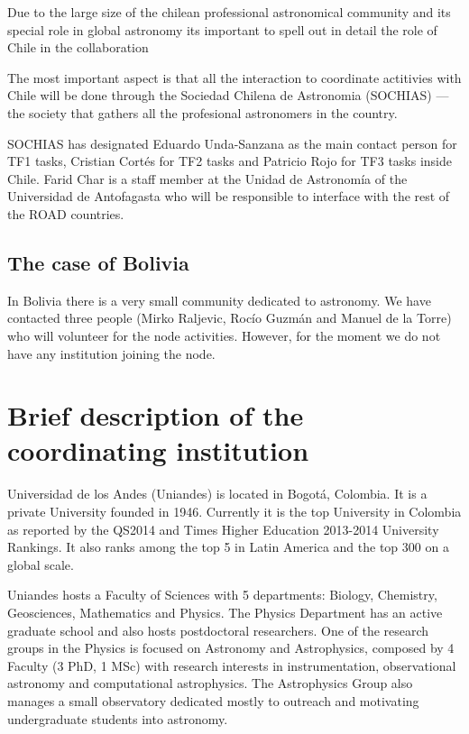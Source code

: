 \documentclass[12pt]{article}
\begin{document}
Due to the large size of the chilean professional astronomical
community and its special role in global astronomy its important to
spell out in detail the role of Chile in the collaboration

The most important aspect is that all the interaction to coordinate
actitivies with Chile will be done through the Sociedad Chilena de
Astronomia (SOCHIAS) --- the society that gathers all the profesional
astronomers in the country.

SOCHIAS has designated Eduardo Unda-Sanzana as the main contact
person for TF1 tasks, Cristian Cort\'es for TF2 tasks and Patricio
Rojo for TF3 tasks inside Chile. Farid Char is a staff member at the
Unidad de Astronomía of the Universidad de Antofagasta who will be
responsible to interface with the rest of the ROAD countries. 


\subsection*{The case of Bolivia}

In Bolivia there is a very small community dedicated to
astronomy. We have contacted three people (Mirko Raljevic, Roc\'io
Guzm\'an and Manuel de la Torre) who will volunteer for the node
activities. However, for the moment we do not have any institution
joining the node.

\appendixpage
\appendix

\section{Brief description of the coordinating institution}

Universidad de los Andes (Uniandes) is located in Bogotá, Colombia. It
is a private University founded in 1946. Currently it is the top
University in Colombia as reported by the QS2014 and Times
Higher Education 2013-2014 University Rankings. It also ranks among
the top 5 in Latin America and the top 300 on a global scale.    

Uniandes hosts a Faculty of Sciences with 5 departments: Biology,
Chemistry, Geosciences, Mathematics and Physics. The Physics
Department has an active graduate school and also hosts postdoctoral
researchers. One of the research groups in the Physics is focused on
Astronomy and Astrophysics, composed by 4 Faculty (3 PhD, 1 MSc) with
research interests in instrumentation, observational astronomy and
computational astrophysics. The Astrophysics Group also manages a
small observatory dedicated mostly to outreach and motivating
undergraduate students into astronomy. 
\end{document}
